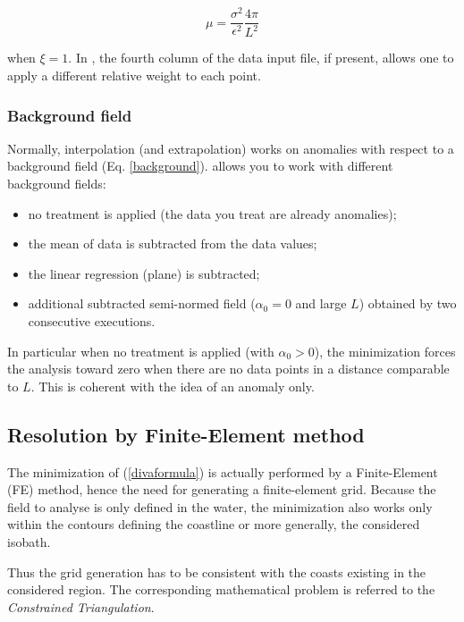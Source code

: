 \begin{equation}
\mu=\frac{\sigma^{2}}{\epsilon^{2}} \frac{4 \pi}{L^{2}}
\end{equation}


when $\xi=1$. In  \diva, the fourth column of the data input file, if present, allows one 
to apply a different relative weight to each point. 


\subsubsection{Background field\label{sec:backgroundfield}}

Normally, interpolation (and extrapolation) works on anomalies with respect to a background field (Eq. \ref{background}). \diva allows you to work with different background fields:

\begin{itemize}
\item no treatment is applied (the data you treat are already anomalies);
\item the mean of data is subtracted from the data values;
\item the linear regression (plane) is subtracted;
\item additional subtracted semi-normed field ($\alpha_0=0$ and large $L$) obtained by two consecutive \diva executions. %
\end{itemize}

In particular when no treatment is applied (with $\alpha_0 > 0$), the minimization forces the analysis toward zero when there are no
data points in a distance comparable to $L$. This is coherent with the idea of an anomaly only.

\subsection{Resolution by Finite-Element method\label{sec:finiteelements}}

The minimization of (\ref{divaformula}) is actually performed by a Finite-Element (FE) method, hence the need for generating a finite-element grid. 
Because the field to analyse is only defined in the water, the minimization also works only within the contours defining the coastline or more generally, the considered isobath.

Thus the grid generation has to be consistent with the coasts existing in the considered region. The corresponding mathematical problem is referred to the \textit{Constrained Triangulation}. %

